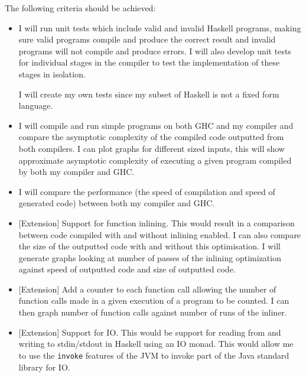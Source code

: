 \documentclass[12pt,a4paper,twoside]{article}
\begin{document}
  The following criteria should be achieved:

  \begin{itemize}

    \item
      I will run unit tests which include valid and invalid Haskell programs, making sure valid programs compile and produce the correct result and invalid
      programs will not compile and produce errors. I will also develop unit tests for individual stages in the compiler to test the implementation of these stages
      in isolation.

      I will create my own tests since my subset of Haskell is not a fixed form language.

    \item

      I will compile and run simple programs on both GHC and my compiler and compare the asymptotic complexity of the
      compiled code outputted from both compilers. I can plot graphs for different sized inputs,
      this will show approximate asymptotic complexity of executing a given program compiled by both my compiler and GHC.

    \item

      I will compare the performance (the speed of compilation and speed of generated code) between both my compiler and GHC.

    \item

      [Extension] Support for function inlining. This would result in a comparison between code compiled with and without inlining enabled. I can also
      compare the size of the outputted code with and without this optimisation. I will generate graphs looking at number of passes of the inlining
      optimization against speed of outputted code and size of outputted code.

    \item

      [Extension] Add a counter to each function call allowing the number of function calls made in a given execution of a
      program to be counted. I can then graph number of function calls against number of runs of the inliner.

    \item

      [Extension] Support for IO. This would be support for reading from and writing to stdin/stdout in Haskell using an IO monad.
      This would allow me to use the \texttt{invoke} features of the JVM to invoke part of the Java standard library for IO.


\end{itemize}
\end{document}
